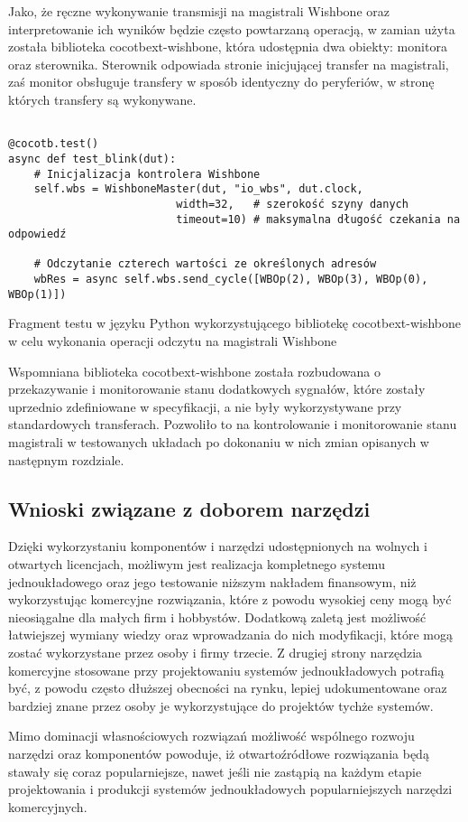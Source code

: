 Jako, że ręczne wykonywanie transmisji na magistrali Wishbone oraz interpretowanie ich wyników będzie często powtarzaną operacją, w zamian użyta została biblioteka cocotbext-wishbone\cite{cocotbext-wishbone:2022:Online}, która udostępnia dwa obiekty: monitora oraz sterownika. Sterownik odpowiada stronie inicjującej transfer na magistrali, zaś monitor obsługuje transfery w sposób identyczny do peryferiów, w stronę których transfery są wykonywane.

\begin{listing}[H]
\begin{verbatim}

@cocotb.test()
async def test_blink(dut):
    # Inicjalizacja kontrolera Wishbone
    self.wbs = WishboneMaster(dut, "io_wbs", dut.clock,
                          width=32,   # szerokość szyny danych
                          timeout=10) # maksymalna długość czekania na odpowiedź

    # Odczytanie czterech wartości ze określonych adresów
    wbRes = async self.wbs.send_cycle([WBOp(2), WBOp(3), WBOp(0), WBOp(1)])
\end{verbatim}
\caption{\label{lst:tooling-cocotbext-wishbone-example}Fragment testu w języku Python wykorzystującego bibliotekę cocotbext-wishbone w celu wykonania operacji odczytu na magistrali Wishbone}
\end{listing}

Wspomniana biblioteka cocotbext-wishbone została rozbudowana o przekazywanie i monitorowanie stanu dodatkowych sygnałów, które zostały uprzednio zdefiniowane w specyfikacji, a nie były wykorzystywane przy standardowych transferach. Pozwoliło to na kontrolowanie i monitorowanie stanu magistrali w testowanych układach po dokonaniu w nich zmian opisanych w następnym rozdziale.

\subsection{Wnioski związane z doborem narzędzi}

Dzięki wykorzystaniu komponentów i narzędzi udostępnionych na wolnych i otwartych licencjach, możliwym jest realizacja kompletnego systemu jednoukładowego oraz jego testowanie niższym nakładem finansowym, niż wykorzystując komercyjne rozwiązania, które z powodu wysokiej ceny mogą być nieosiągalne dla małych firm i hobbystów.
Dodatkową zaletą jest możliwość łatwiejszej wymiany wiedzy oraz wprowadzania do nich modyfikacji, które mogą zostać wykorzystane przez osoby i firmy trzecie.
Z drugiej strony narzędzia komercyjne stosowane przy projektowaniu systemów jednoukładowych potrafią być, z powodu często dłuższej obecności na rynku, lepiej udokumentowane oraz bardziej znane przez osoby je wykorzystujące do projektów tychże systemów.

Mimo dominacji własnościowych rozwiązań możliwość wspólnego rozwoju narzędzi oraz komponentów powoduje, iż otwartoźródłowe rozwiązania będą stawały się coraz popularniejsze, nawet jeśli nie zastąpią na każdym etapie projektowania i produkcji systemów jednoukładowych popularniejszych narzędzi komercyjnych.

